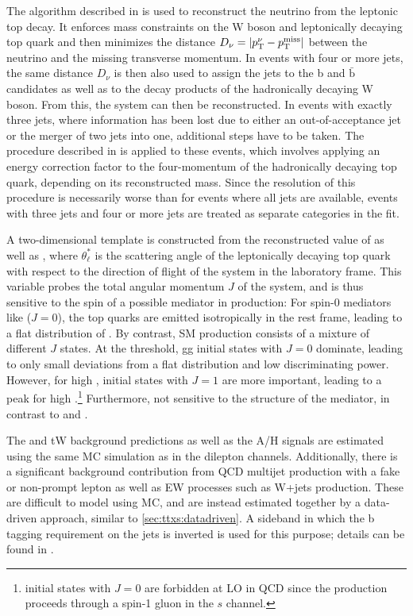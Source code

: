 The algorithm described in  is used to reconstruct the neutrino from the leptonic top decay. It enforces mass constraints on the W boson and leptonically decaying top quark and then minimizes the distance $D_\nu = |p_{\mathrm{T}}^\nu - p_{\mathrm{T}}^{\mathrm{miss}}|$ between the neutrino \pt and the missing transverse momentum. In events with four or more jets, the same distance $D_\nu$ is then also used to assign the jets to the b and $\bar{\mathrm{b}}$ candidates as well as to the decay products of the hadronically decaying W boson. From this, the \ttbar system can then be reconstructed. In events with exactly three jets, where information has been lost due to either an out-of-acceptance jet or the merger of two jets into one, additional steps have to be taken. The procedure described in  is applied to these events, which involves applying an energy correction factor to the four-momentum of the hadronically decaying top quark, depending on its reconstructed mass. Since the resolution of this procedure is necessarily worse than for events where all jets are available, events with three jets and four or more jets are treated as separate categories in the fit.

A two-dimensional template is constructed from the reconstructed value of \mtt as well as \abscostl, where $\theta^*_\ell$ is the scattering angle of the leptonically decaying top quark with respect to the direction of flight of the \ttbar system in the laboratory frame. This variable probes the total angular momentum $J$ of the \ttbar system, and is thus sensitive to the spin of a possible mediator in \ttbar production: 
For spin-0 mediators like \AH ($J=0$), the top quarks are emitted isotropically in the \ttbar rest frame, leading to a flat distribution of \abscostl.
By contrast, SM \ttbar production consists of a mixture of different $J$ states. At the \ttbar threshold, gg initial states with $J=0$ dominate, leading to only small deviations from a flat \abscostl distribution and low discriminating power. However, for high \mtt, \qqbar initial states with $J=1$ are more important, leading to a peak for high \abscostl.\footnote{\qqbar initial states with $J=0$ are forbidden at LO in QCD since the production proceeds through a spin-1 gluon in the $s$ channel.}
Furthermore, \abscostl not sensitive to the \CP structure of the mediator, in contrast to \chel and \chan.

The \ttbar and tW background predictions as well as the A/H signals are estimated using the same MC simulation as in the dilepton channels. Additionally, there is a significant background contribution from QCD multijet production with a fake or non-prompt lepton as well as EW processes such as W+jets production. These are difficult to model using MC, and are instead estimated together by a data-driven approach, similar to \cref{sec:ttxs:datadriven}. A sideband in which the b tagging requirement on the jets is inverted is used for this purpose; details can be found in .

